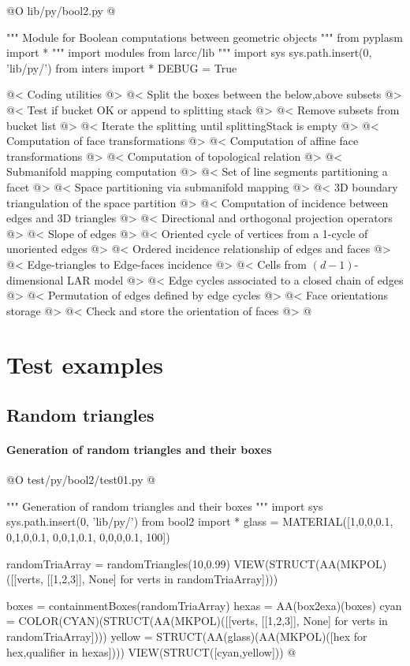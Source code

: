 \documentclass[11pt,oneside]{article}    %
\begin{document}
@O lib/py/bool2.py
@{""" Module for Boolean computations between geometric objects """
from pyplasm import *
""" import modules from larcc/lib """
import sys
sys.path.insert(0, 'lib/py/')
from inters import *
DEBUG = True

@< Coding utilities @>
@< Split the boxes between the below,above subsets @>
@< Test if bucket OK or append to splitting stack @>
@< Remove subsets from bucket list @>
@< Iterate the splitting until splittingStack is empty @>
@< Computation of face transformations @>
@< Computation of affine face transformations @>
@< Computation of topological relation @>
@< Submanifold mapping computation @>
@< Set of line segments partitioning a facet @>
@< Space partitioning via submanifold mapping @>
@< 3D boundary triangulation of the space partition @>
@< Computation of incidence between edges and 3D triangles @>
@< Directional and orthogonal projection operators @>
@< Slope of edges @>
@< Oriented cycle of vertices from a 1-cycle of unoriented edges @>
@< Ordered incidence relationship of edges and faces @>
@< Edge-triangles to Edge-faces incidence @>
@< Cells from $(d-1)$-dimensional LAR model @>
@< Edge cycles associated to a closed chain of edges @>
@< Permutation of edges defined by edge cycles @>
@< Face orientations storage @>
@< Check and store the orientation of faces @>
@}
    
\section{Test examples}

\subsection{Random triangles}


\paragraph{Generation of random triangles and their boxes}
@O test/py/bool2/test01.py
@{""" Generation of random triangles and their boxes """
import sys
sys.path.insert(0, 'lib/py/')
from bool2 import *
glass = MATERIAL([1,0,0,0.1,  0,1,0,0.1,  0,0,1,0.1, 0,0,0,0.1, 100])

randomTriaArray = randomTriangles(10,0.99)
VIEW(STRUCT(AA(MKPOL)([[verts, [[1,2,3]], None] for verts in randomTriaArray])))

boxes = containmentBoxes(randomTriaArray)
hexas = AA(box2exa)(boxes)
cyan = COLOR(CYAN)(STRUCT(AA(MKPOL)([[verts, [[1,2,3]], None] for verts in randomTriaArray])))
yellow = STRUCT(AA(glass)(AA(MKPOL)([hex for hex,qualifier in hexas])))
VIEW(STRUCT([cyan,yellow]))
@}
\end{document}
